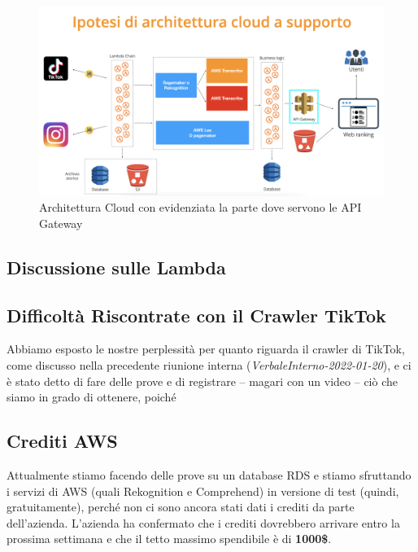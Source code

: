 \begin{figure}[!h]
\centering
\includegraphics[scale=0.35]{Sezioni/images/Architettura.png}
\caption{Architettura Cloud con evidenziata la parte dove servono le API Gateway}
\end{figure}

\subsection{Discussione sulle Lambda}



\subsection{Difficoltà Riscontrate con il Crawler TikTok}

Abbiamo esposto le nostre perplessità per quanto riguarda il crawler di TikTok, come discusso nella precedente riunione interna (\textit{VerbaleInterno-2022-01-20}), e ci è stato detto di fare delle prove e di registrare – magari con un video – ciò che siamo in grado di ottenere, poiché 

\subsection{Crediti AWS}

Attualmente stiamo facendo delle prove su un database RDS e stiamo sfruttando i servizi di AWS (quali Rekognition e Comprehend) in versione di test (quindi, gratuitamente), perché non ci sono ancora stati dati i crediti da parte dell'azienda. L'azienda ha confermato che i crediti dovrebbero arrivare entro la prossima settimana e che il tetto massimo spendibile è di \textbf{1000\$}.

\pagebreak